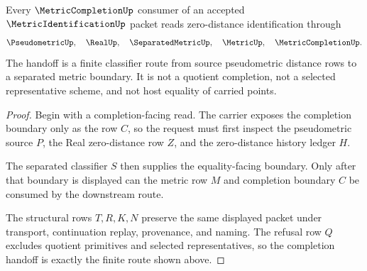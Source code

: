 \begin{theorem}
\label{thm:metric-identification-completion-handoff}
Every $\MetricCompletionUp$ consumer of an accepted $\MetricIdentificationUp$ packet reads zero-distance identification through
$$
\PseudometricUp,\quad \RealUp,\quad \SeparatedMetricUp,\quad \MetricUp,\quad \MetricCompletionUp .
$$
The handoff is a finite classifier route from source pseudometric distance rows to a separated metric boundary. It is not a quotient completion, not a selected representative scheme, and not host equality of carried points.
\end{theorem}
\begin{proof}
Begin with a completion-facing read. The carrier exposes the completion boundary only as the row $C$, so the request must first inspect the pseudometric source $P$, the Real zero-distance row $Z$, and the zero-distance history ledger $H$.

The separated classifier $S$ then supplies the equality-facing boundary. Only after that boundary is displayed can the metric row $M$ and completion boundary $C$ be consumed by the downstream route.

The structural rows $T,R,K,N$ preserve the same displayed packet under transport, continuation replay, provenance, and naming. The refusal row $Q$ excludes quotient primitives and selected representatives, so the completion handoff is exactly the finite route shown above.
\end{proof}




